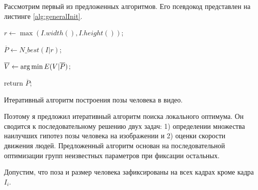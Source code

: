 Рассмотрим первый из предложенных алгоритмов. Его псевдокод представлен на листинге \ref{alg:generalInit}. 

\begin{algorithm}[t]
	\SetAlgoLined %
	
	
	
	$r \leftarrow \max(I.width(), I.height())$;
	
	$\overline{P} \leftarrow N\_best(I|r)$;
	
	$\overline{V} \leftarrow \operatorname*{arg\,min}{E(V|\overline{P})}$;
	
	
	return $\overline{P}$;
	
	\caption{Итеративный алгоритм построения позы человека в видео.}
	\label{alg:generalInit}
\end{algorithm}

 Поэтому я предложил итеративный алгоритм поиска локального оптимума. Он сводится к последовательному решению двух задач: 1) определении множества наилучших гипотез позы человека на изображении и 2) оценки скорости движения людей. Предложенный алгоритм основан на последовательной оптимизации групп неизвестных параметров при фиксации остальных.

Допустим, что поза и размер человека зафиксированы на всех кадрах кроме кадра $I_i$.

